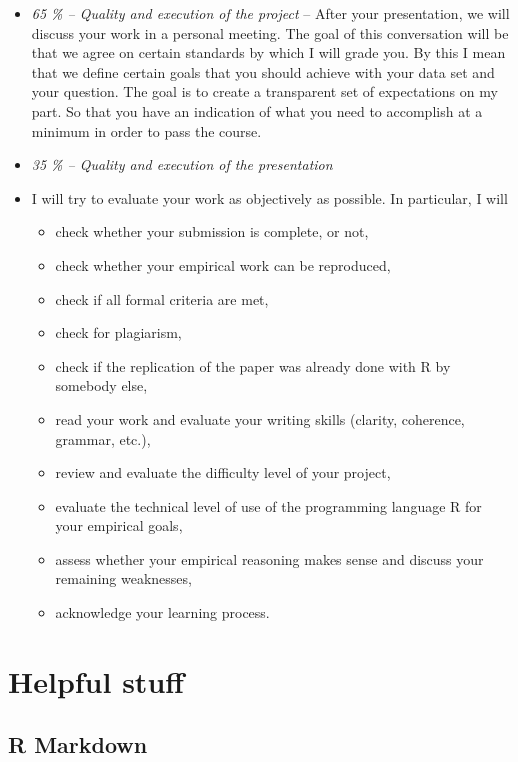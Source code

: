 \documentclass[
  12pt,
]{article}
\providecommand{\tightlist}{%
  \setlength{\itemsep}{0pt}\setlength{\parskip}{0pt}}
\begin{document}
\begin{itemize}
\item
  \emph{65 \% -- Quality and execution of the project}
  -- After your presentation, we will discuss your work in a personal meeting. The goal of this conversation will be that we agree on certain standards by which I will grade you. By this I mean that we define certain goals that you should achieve with your data set and your question. The goal is to create a transparent set of expectations on my part. So that you have an indication of what you need to accomplish at a minimum in order to pass the course.
\item
  \emph{35 \% -- Quality and execution of the presentation}
\item
  I will try to evaluate your work as objectively as possible. In particular, I will

  \begin{itemize}
  \tightlist
  \item
    check whether your submission is complete, or not,
  \item
    check whether your empirical work can be reproduced,
  \item
    check if all formal criteria are met,
  \item
    check for plagiarism,
  \item
    check if the replication of the paper was already done with R by somebody else,
  \item
    read your work and evaluate your writing skills (clarity, coherence, grammar, etc.),
  \item
    review and evaluate the difficulty level of your project,
  \item
    evaluate the technical level of use of the programming language R for your empirical goals,
  \item
    assess whether your empirical reasoning makes sense and discuss your remaining weaknesses,
  \item
    acknowledge your learning process.
  \end{itemize}
\end{itemize}

\hypertarget{helpful-stuff}{%
\section{Helpful stuff}\label{helpful-stuff}}

\hypertarget{r-markdown}{%
\subsection{R Markdown}\label{r-markdown}}
\end{document}

